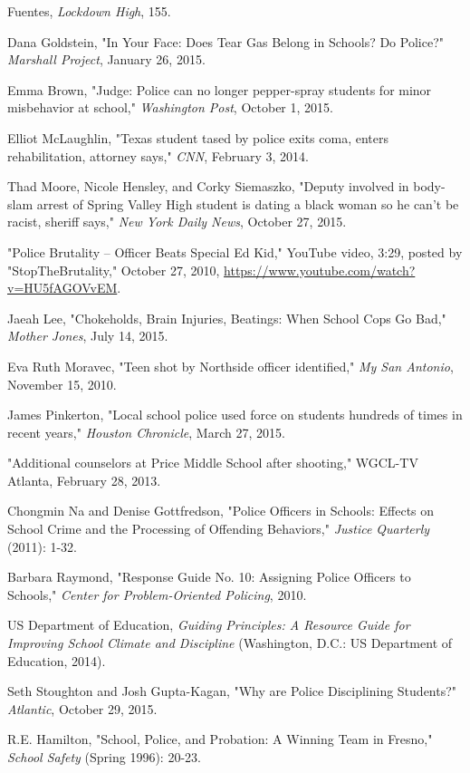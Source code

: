 \documentclass[fontset=fandol, a4paper, 12pt, openright]{ctexbook}
\begin{document}
\begin{enumerate}[label={[\arabic*]}]
    \item Fuentes, \textit{Lockdown High}, 155.
    \item Dana Goldstein, "In Your Face: Does Tear Gas Belong in Schools? Do Police?" \textit{Marshall Project}, January 26, 2015.
    \item Emma Brown, "Judge: Police can no longer pepper-spray students for minor misbehavior at school," \textit{Washington Post}, October 1, 2015.
    \item Elliot McLaughlin, "Texas student tased by police exits coma, enters rehabilitation, attorney says," \textit{CNN}, February 3, 2014.
    \item Thad Moore, Nicole Hensley, and Corky Siemaszko, "Deputy involved in body-slam arrest of Spring Valley High student is dating a black woman so he can't be racist, sheriff says," \textit{New York Daily News}, October 27, 2015.
    \item "Police Brutality -- Officer Beats Special Ed Kid," YouTube video, 3:29, posted by "StopTheBrutality," October 27, 2010, \url{https://www.youtube.com/watch?v=HU5fAGOVvEM}.
    \item Jaeah Lee, "Chokeholds, Brain Injuries, Beatings: When School Cops Go Bad," \textit{Mother Jones}, July 14, 2015.
    \item Eva Ruth Moravec, "Teen shot by Northside officer identified," \textit{My San Antonio}, November 15, 2010.
    \item James Pinkerton, "Local school police used force on students hundreds of times in recent years," \textit{Houston Chronicle}, March 27, 2015.
    \item "Additional counselors at Price Middle School after shooting," WGCL-TV Atlanta, February 28, 2013.
    \item Chongmin Na and Denise Gottfredson, "Police Officers in Schools: Effects on School Crime and the Processing of Offending Behaviors," \textit{Justice Quarterly} (2011): 1-32.
    \item Barbara Raymond, "Response Guide No. 10: Assigning Police Officers to Schools," \textit{Center for Problem-Oriented Policing}, 2010.
    \item US Department of Education, \textit{Guiding Principles: A Resource Guide for Improving School Climate and Discipline} (Washington, D.C.: US Department of Education, 2014).
    \item Seth Stoughton and Josh Gupta-Kagan, "Why are Police Disciplining Students?" \textit{Atlantic}, October 29, 2015.
    \item R.E. Hamilton, "School, Police, and Probation: A Winning Team in Fresno," \textit{School Safety} (Spring 1996): 20-23.

\end{enumerate}
\end{document}
